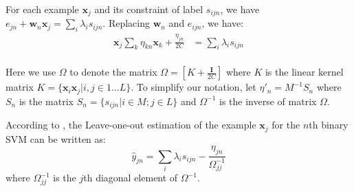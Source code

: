 For each example $\textbf{x}_j$ and its constraint of label $s_{ijn}$, we have $e_{jn}  + \textbf{w}_n\textbf{x}_j= \sum_i\lambda_is_{ijn}$. Replacing $\textbf{w}_n$ and $e_{ijn}$,  we have:
\begin{equation}
\begin{aligned}
\textbf{x}_j\sum_k\eta_{kn}\textbf{x}_k+\frac{\eta_{jn}}{2C}&=\sum_i\lambda_is_{ijn}\\
\end{aligned}
\end{equation}

Here we use $\Omega$ to denote the matrix $\Omega=[K+\frac{\mathbf{I}}{2C}]$ where $K$ is the linear kernel matrix $K=\{\textbf{x}_i\textbf{x}_j|i,j\in 1\dots L\}$. To simplify our notation, let ${\eta}'_{n}=M^{-1}S_n$ where $S_n$ is the matrix $S_n=\{s_{ijn}|i\in M;j\in L\}$ and $\Omega^{-1}$ is the inverse of matrix $\Omega$. 

According to  \cite{cawley2006leave}, the Leave-one-out estimation of the example $\textbf{x}_j$ for the $n$th binary SVM can be written as:
\begin{equation}\label{eq:yhat}
\hat{y}_{jn} = \sum_i\lambda_is_{ijn}-\frac{{\eta}_{jn}}{\Omega_{jj}^{-1}}
\end{equation}
where $\Omega^{-1}_{jj}$ is the $j$th diagonal element of $\Omega^{-1}$.
